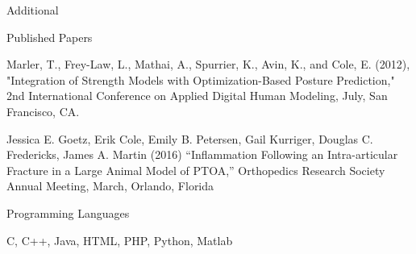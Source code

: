 \documentclass{resume} %
\begin{document}
\begin{rSection}{Additional}

\begin{rSubsection}{Published Papers}{}{}{}
\item Marler, T., Frey-Law, L., Mathai, A., Spurrier, K., Avin, K., and Cole, E. (2012), "Integration of Strength Models with Optimization-Based Posture Prediction," 2nd International Conference on Applied Digital Human Modeling, July, San Francisco, CA.
\item Jessica E. Goetz, Erik Cole, Emily B. Petersen, Gail Kurriger, Douglas C. Fredericks, James A. Martin (2016) “Inflammation Following an Intra-articular Fracture in a Large Animal Model of PTOA,” Orthopedics Research Society Annual Meeting, March, Orlando, Florida
\end{rSubsection}

\begin{rSubsection}{Programming Languages}{}{}{}
	\item C, C++, Java, HTML, PHP, Python, Matlab
	
\end{rSubsection}



%
%
\end{rSection}
\end{document}
